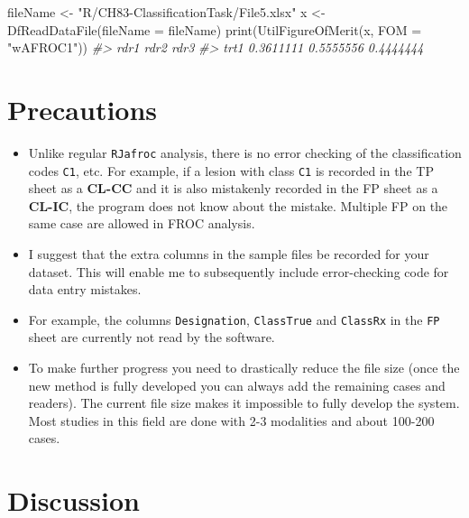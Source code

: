 \documentclass[
]{book}
\newenvironment{Shaded}{\begin{snugshade}}{\end{snugshade}}
\newcommand{\AttributeTok}[1]{\textcolor[rgb]{0.77,0.63,0.00}{#1}}
\newcommand{\CommentTok}[1]{\textcolor[rgb]{0.56,0.35,0.01}{\textit{#1}}}
\newcommand{\FunctionTok}[1]{\textcolor[rgb]{0.00,0.00,0.00}{#1}}
\newcommand{\NormalTok}[1]{#1}
\newcommand{\OtherTok}[1]{\textcolor[rgb]{0.56,0.35,0.01}{#1}}
\newcommand{\StringTok}[1]{\textcolor[rgb]{0.31,0.60,0.02}{#1}}
\providecommand{\tightlist}{%
  \setlength{\itemsep}{0pt}\setlength{\parskip}{0pt}}
\begin{document}
\begin{Shaded}
\begin{Highlighting}[]
\NormalTok{fileName }\OtherTok{\textless{}{-}} \StringTok{"R/CH83{-}ClassificationTask/File5.xlsx"}
\NormalTok{x }\OtherTok{\textless{}{-}} \FunctionTok{DfReadDataFile}\NormalTok{(}\AttributeTok{fileName =}\NormalTok{ fileName)}
\FunctionTok{print}\NormalTok{(}\FunctionTok{UtilFigureOfMerit}\NormalTok{(x, }\AttributeTok{FOM =} \StringTok{"wAFROC1"}\NormalTok{))}
\CommentTok{\#\textgreater{}           rdr1      rdr2      rdr3}
\CommentTok{\#\textgreater{} trt1 0.3611111 0.5555556 0.4444444}
\end{Highlighting}
\end{Shaded}

\hypertarget{classification-tasks-precautions}{%
\section{Precautions}\label{classification-tasks-precautions}}

\begin{itemize}
\tightlist
\item
  Unlike regular \texttt{RJafroc} analysis, there is no error checking of the classification codes \texttt{C1}, etc. For example, if a lesion with class \texttt{C1} is recorded in the TP sheet as a \textbf{CL-CC} and it is also mistakenly recorded in the FP sheet as a \textbf{CL-IC}, the program does not know about the mistake. Multiple FP on the same case are allowed in FROC analysis.
\item
  I suggest that the extra columns in the sample files be recorded for your dataset. This will enable me to subsequently include error-checking code for data entry mistakes.
\item
  For example, the columns \texttt{Designation}, \texttt{ClassTrue} and \texttt{ClassRx} in the \texttt{FP} sheet are currently not read by the software.
\item
  To make further progress you need to drastically reduce the file size (once the new method is fully developed you can always add the remaining cases and readers). The current file size makes it impossible to fully develop the system. Most studies in this field are done with 2-3 modalities and about 100-200 cases.
\end{itemize}

\hypertarget{classification-tasks-discussion}{%
\section{Discussion}\label{classification-tasks-discussion}}
\end{document}
